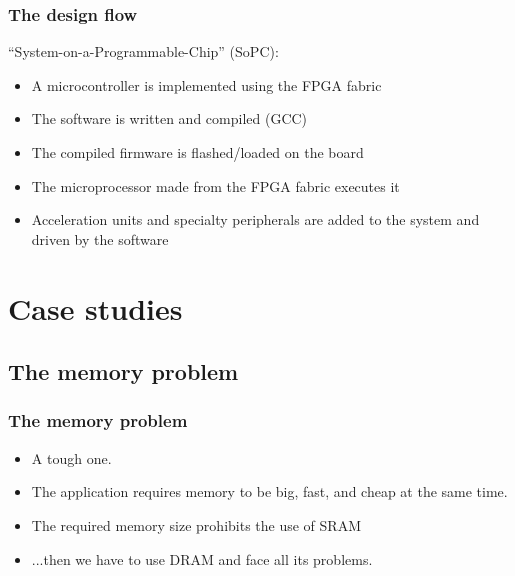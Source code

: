 \documentclass{beamer}
\begin{document}
\frame
{
  \frametitle{The design flow}
  
  ``System-on-a-Programmable-Chip'' (SoPC):
  \begin{itemize}
  \item A microcontroller is implemented using the FPGA fabric
  \item The software is written and compiled (GCC)
  \item The compiled firmware is flashed/loaded on the board
  \item The microprocessor made from the FPGA fabric executes it
  \item Acceleration units and specialty peripherals are added to the system and driven by the software
  \end{itemize}
}

\section{Case studies}

\subsection{The memory problem}
\frame
{
  \begin{center}
  \end{center}
}

\frame
{
  \frametitle{The memory problem}
  
  \begin{itemize}
  \item A tough one.
  \item The application requires memory to be big, fast, and cheap at the same time.
  \item The required memory size prohibits the use of SRAM
  \item ...then we have to use DRAM and face all its problems.
  \end{itemize}
}
\end{document}
